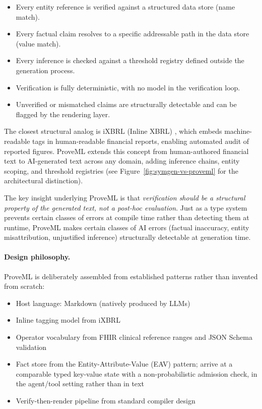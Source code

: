 \documentclass[11pt,a4paper]{article}
\begin{document}
\begin{itemize}
    \item Every entity reference is verified against a structured data store (name match).
    \item Every factual claim resolves to a specific addressable path in the data store (value match).
    \item Every inference is checked against a threshold registry defined outside the generation process.
    \item Verification is fully deterministic, with no model in the verification loop.
    \item Unverified or mismatched claims are structurally detectable and can be flagged by the rendering layer.
\end{itemize}

The closest structural analog is iXBRL (Inline XBRL) \citep{ixbrl}, which embeds machine-readable tags in human-readable financial reports, enabling automated audit of reported figures. ProveML extends this concept from human-authored financial text to AI-generated text across any domain, adding inference chains, entity scoping, and threshold registries (see Figure~\ref{fig:symgen-vs-proveml} for the architectural distinction).

The key insight underlying ProveML is that \textit{verification should be a structural property of the generated text, not a post-hoc evaluation}. Just as a type system prevents certain classes of errors at compile time rather than detecting them at runtime, ProveML makes certain classes of AI errors (factual inaccuracy, entity misattribution, unjustified inference) structurally detectable at generation time.

\paragraph{Design philosophy.} ProveML is deliberately assembled from established patterns rather than invented from scratch:

\begin{itemize}[nosep]
    \item Host language: Markdown (natively produced by LLMs)
    \item Inline tagging model from iXBRL \citep{ixbrl}
    \item Operator vocabulary from FHIR clinical reference ranges \citep{fhir} and JSON Schema validation
    \item Fact store from the Entity-Attribute-Value (EAV) pattern; \citet{toolgate} arrive at a comparable typed key-value state with a non-probabilistic admission check, in the agent/tool setting rather than in text
    \item Verify-then-render pipeline from standard compiler design
\end{itemize}
\end{document}
